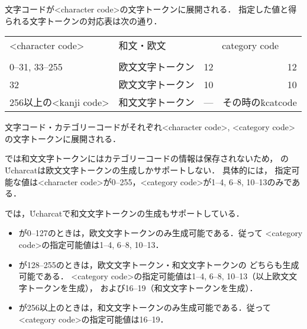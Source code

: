\documentclass[a4paper,11pt,nomag]{jsarticle}
\begin{document}
\begin{cslist}
  文字コードが<character code>の文字トークンに展開される．
  指定した値と得られる文字トークンの対応表は次の通り．
  \begin{center}
	\small
	\begin{tabular}{llrr}
	  \toprule
	  <character code>&和文・欧文&\multicolumn{2}{c}{category code}\\\cmidrule(lr){3-4}
	  &&\epTeX&\eupTeX\\
	  \midrule
	  0--31, 33--255&欧文文字トークン&12&12\\
	  32            &欧文文字トークン&10&10\\
	  256以上の<kanji code>&和文文字トークン&---&その時の\.{kcatcode}\footnotemark\\
	  \bottomrule
	\end{tabular}
  \end{center}

  文字コード・カテゴリーコードがそれぞれ<character code>, <category code>の文字トークンに展開される．

  \epTeX では和文文字トークンにはカテゴリーコードの情報は保存されないため，
  \epTeX の\.{Ucharcat}は欧文文字トークンの生成しかサポートしない．
  具体的には，
  指定可能な値は<character code>が0--255，<category code>が1--4, 6--8, 10--13のみである．
\end{cslist}
\begin{dangerous}
  \eupTeX では，\.{Ucharcat}で和文文字トークンの生成もサポートしている．

  \medskip
  \begin{itemize}
	\item <character code>が0--127のときは，欧文文字トークンのみ生成可能である．従って
	<category code>の指定可能値は1--4, 6--8, 10--13．
	\item <character code>が128--255のときは，欧文文字トークン・和文文字トークンの
	どちらも生成可能である．
	<category code>の指定可能値は1--4, 6--8, 10--13（以上欧文文字トークンを生成），
	および16--19（和文文字トークンを生成）．
	\item <character code>が256以上のときは，和文文字トークンのみ生成可能である．従って
	<category code>の指定可能値は16--19．
  \end{itemize}
\end{dangerous}
\end{document}
